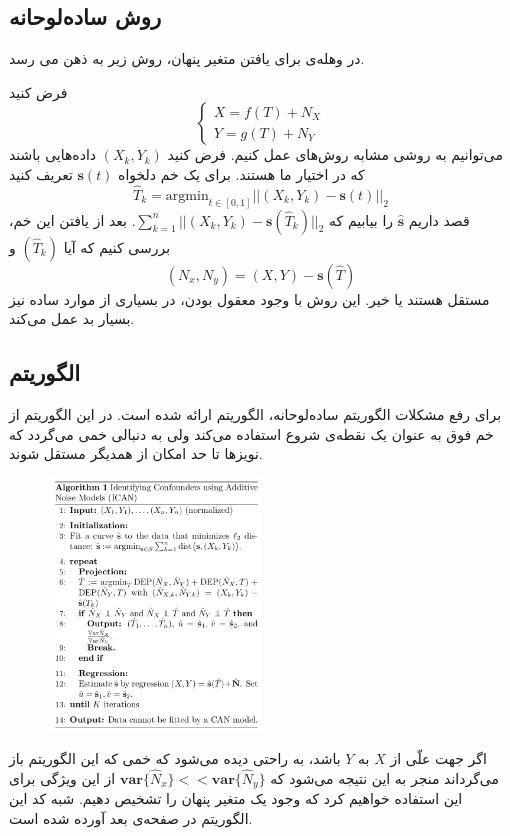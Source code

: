 \documentclass[a4paper,12pt]{article}
\def\hat{\widehat}
\begin{document}
\subsection{روش ساده‌لوحانه}
در وهله‌ی برای یافتن متغیر‌ پنهان، روش زیر به ذهن می رسد.

 فرض کنید 
	\begin{equation*}
	\begin{cases}
	X = f(T) + N_X\\
	Y = g(T) + N_Y
	\end{cases}
	\end{equation*}
می‌توانیم به روشی مشابه روش‌های
عمل کنیم. فرض کنید $(X_k, Y_k)$ داده‌هایی باشند که در اختیار ما هستند. برای یک خم دلخواه 
$\mathbf{s}(t)$
تعریف کنید
$$\hat{T}_k = \mathrm{argmin}_{t\in[0,1]} ||(X_k, Y_k) - \mathbf{s}(t)||_2$$ 
قصد داریم 
$\hat{\mathbf{s}}$ 
را بیابیم که
$\sum^n_{k=1} ||(X_k, Y_k) - \mathbf{s}(\hat{T}_k)||_2$. 
بعد از یافتن این خم، بررسی کنیم که آیا $(\hat{T}_k)$
و
$$(N_x, N_y) = (X, Y) - \mathbf{s}(\hat{T})$$
مستقل هستند یا خیر. این روش با وجود معقول بودن، در بسیاری از موارد ساده نیز بسیار بد عمل می‌کند.
\subsection{الگوریتم }
برای رفع مشکلات الگوریتم ساده‌لوحانه، الگوریتم
ارائه شده است. در این الگوریتم از خم فوق به عنوان یک نقطه‌ی شروع استفاده می‌کند ولی به دنبالی خمی می‌گردد که نویز‌ها تا حد امکان از همدیگر مستقل شوند. 

\begin{figure}[h!]
	\begin{center}
		\includegraphics[width=0.5\textwidth]{ican.png}
	\end{center}
\end{figure}
اگر جهت علّی از $X$ به $Y$ باشد، به راحتی دیده ‌می‌شود که خمی که این الگوریتم باز می‌گرداند منجر به این نتیجه می‌شود که 
$\mathbf{var}\{\hat{N}_x\}<<\mathbf{var}\{\hat{N}_y\}$
از این ویژگی برای این استفاده خواهیم کرد که وجود یک متغیر پنهان را تشخیص دهیم.  شبه کد این الگوریتم در صفحه‌‌ی بعد آورده شده است.
\end{document}
